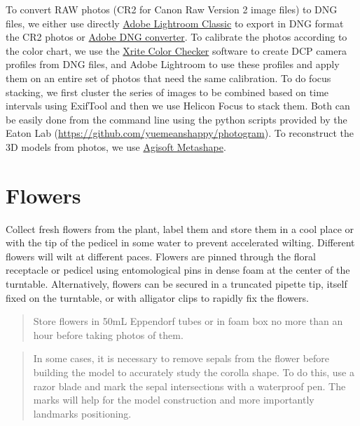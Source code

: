\documentclass[
]{book}
\begin{document}
To convert RAW photos (CR2 for Canon Raw Version 2 image files) to DNG
files, we either use directly \href{https://www.adobe.com/ca_fr/products/photoshop-lightroom-classic.html}{Adobe Lightroom
Classic}
to export in DNG format the CR2 photos or \href{https://helpx.adobe.com/camera-raw/using/adobe-dng-converter.html}{Adobe DNG
converter}.
To calibrate the photos according to the color chart, we use the \href{https://xritephoto.com/ph_product_overview.aspx?ID=938\&Action=Support\&SoftwareID=2030}{Xrite
Color
Checker}
software to create DCP camera profiles from DNG files, and Adobe
Lightroom to use these profiles and apply them on an entire set of
photos that need the same calibration. To do focus stacking, we first cluster the series of images to be combined based on time intervals using ExifTool and then we use Helicon Focus to stack them. Both can be easily done from the command line using the python scripts provided by the Eaton Lab (\url{https://github.com/yuemeanshappy/photogram}). To reconstruct the 3D models from photos, we use \href{https://www.agisoft.com/downloads/installer/}{Agisoft Metashape}.

\hypertarget{flowers}{%
\section{Flowers}\label{flowers}}

Collect fresh flowers from the plant, label them and store them in a
cool place or with the tip of the pedicel in some water to prevent
accelerated wilting. Different flowers will wilt at different paces.
Flowers are pinned through the floral receptacle or pedicel using
entomological pins in dense foam at the center of the turntable.
Alternatively, flowers can be secured in a truncated pipette tip, itself
fixed on the turntable, or with alligator clips to rapidly fix the
flowers.

\begin{quote}
Store flowers in 50mL Eppendorf tubes or in foam box no more than an
hour before taking photos of them.
\end{quote}

\begin{quote}
In some cases, it is necessary to remove sepals from the flower before
building the model to accurately study the corolla shape. To do this,
use a razor blade and mark the sepal intersections with a waterproof
pen. The marks will help for the model construction and more importantly
landmarks positioning.
\end{quote}
\end{document}
